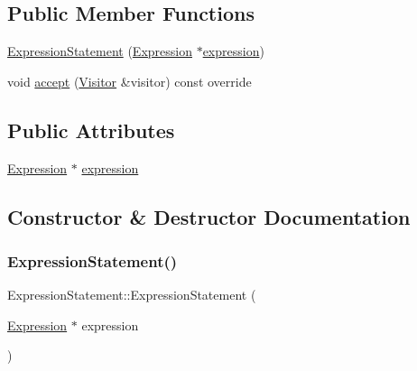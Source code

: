 \subsection*{Public Member Functions}
\begin{DoxyCompactItemize}
\item 
\hyperlink{struct_expression_statement_ad195f09357c26895bf7b8ac7e30ddde3}{Expression\+Statement} (\hyperlink{struct_expression}{Expression} $\ast$\hyperlink{struct_expression_statement_af8fa751297f7dd719ebe74d62201fc3a}{expression})
\item 
void \hyperlink{struct_expression_statement_a6463f779ec4140b2510d854726aefd40}{accept} (\hyperlink{struct_visitor}{Visitor} \&visitor) const override
\end{DoxyCompactItemize}
\subsection*{Public Attributes}
\begin{DoxyCompactItemize}
\item 
\hyperlink{struct_expression}{Expression} $\ast$ \hyperlink{struct_expression_statement_af8fa751297f7dd719ebe74d62201fc3a}{expression}
\end{DoxyCompactItemize}


\subsection{Constructor \& Destructor Documentation}
\mbox{\label{struct_expression_statement_ad195f09357c26895bf7b8ac7e30ddde3}} 
\subsubsection{\texorpdfstring{Expression\+Statement()}{ExpressionStatement()}}
{\footnotesize\ttfamily Expression\+Statement\+::\+Expression\+Statement (\begin{DoxyParamCaption}\item[{\hyperlink{struct_expression}{Expression} $\ast$}]{expression }\end{DoxyParamCaption})\hspace{0.3cm}{\ttfamily [inline]}}



